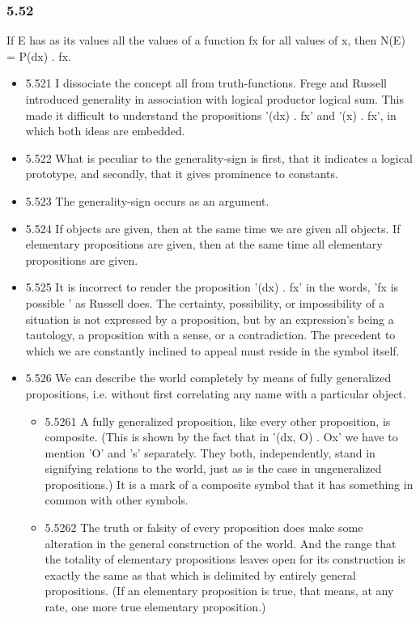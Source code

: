 \documentclass[11pt]{article}
\begin{document}
\subsubsection*{5.52}
\label{sec:org862e045}
If E has as its values all the values of a function fx for all values
of x, then N(E) = P(dx) . fx.
\begin{itemize}
\item 5.521
\label{sec:org03a1242}
I dissociate the concept all from truth-functions. Frege and Russell
introduced generality in association with logical productor logical sum.
This made it difficult to understand the propositions '(dx) . fx' and '(x)
. fx', in which both ideas are embedded.
\item 5.522
\label{sec:org9639366}
What is peculiar to the generality-sign is first, that it indicates a
logical prototype, and secondly, that it gives prominence to constants.
\item 5.523
\label{sec:orge4bca9b}
The generality-sign occurs as an argument.
\item 5.524
\label{sec:org1f41238}
If objects are given, then at the same time we are given all objects.
If elementary propositions are given, then at the same time all elementary
propositions are given.
\item 5.525
\label{sec:orgce27a29}
It is incorrect to render the proposition '(dx) . fx' in the words,
'fx is possible ' as Russell does. The certainty, possibility, or
impossibility of a situation is not expressed by a proposition, but by an
expression's being a tautology, a proposition with a sense, or a
contradiction. The precedent to which we are constantly inclined to appeal
must reside in the symbol itself.
\item 5.526
\label{sec:org520b77e}
We can describe the world completely by means of fully generalized
propositions, i.e. without first correlating any name with a particular
object.
\begin{itemize}
\item 5.5261
\label{sec:org22502e0}
A fully generalized proposition, like every other proposition, is
composite. (This is shown by the fact that in '(dx, O) . Ox' we have to
mention 'O' and 's' separately. They both, independently, stand in
signifying relations to the world, just as is the case in ungeneralized
propositions.) It is a mark of a composite symbol that it has something in
common with other symbols.
\item 5.5262
\label{sec:orgc8c84bc}
The truth or falsity of every proposition does make some alteration
in the general construction of the world. And the range that the totality
of elementary propositions leaves open for its construction is exactly the
same as that which is delimited by entirely general propositions. (If an
elementary proposition is true, that means, at any rate, one more true
elementary proposition.)
\end{itemize}
\end{itemize}
\end{document}

